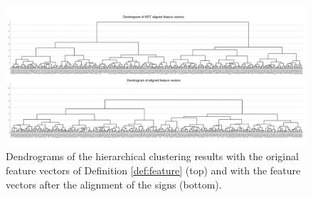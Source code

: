 \documentclass{article}
\begin{document}
\begin{figure}[t]
\label{fig:mnist_v}
\includegraphics[width=160mm]{mnist_dendrogram.png}\vspace{-0.02\hsize}
\caption{Dendrograms of the hierarchical clustering results with the original feature vectors of Definition \ref{def:feature} (top) and with the feature vectors after the alignment of the signs (bottom). }\vspace{0.03\hsize}
\label{fig:mnist_dendrogram}
\end{figure}
\end{document}
